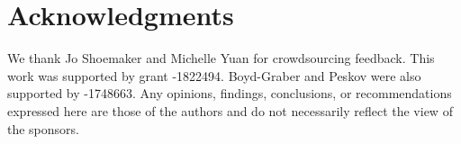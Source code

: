 \section*{Acknowledgments}
We thank Jo Shoemaker and Michelle Yuan for crowdsourcing feedback.
This work was supported by  grant -1822494.  Boyd-Graber and Peskov were also supported by
-1748663.
Any opinions, findings, conclusions,
or recommendations expressed here are those of the authors and do not 
necessarily reflect the view of the sponsors.
